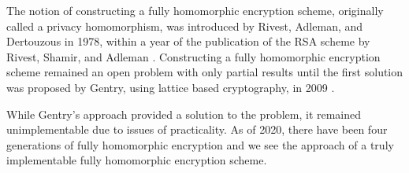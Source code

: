 The notion of constructing a fully homomorphic encryption scheme, originally called a privacy homomorphism, was introduced by Rivest, Adleman, and Dertouzous in 1978, within a year of the publication of the RSA scheme by Rivest, Shamir, and Adleman \cite{rivest1978}. Constructing a fully homomorphic encryption scheme remained an open problem with only partial results until the first solution was proposed by Gentry, using lattice based cryptography, in 2009 \cite{gentry}.

While Gentry's approach provided a solution to the problem, it remained unimplementable due to issues of practicality. As of 2020, there have been four generations of fully homomorphic encryption and we see the approach of a truly implementable fully homomorphic encryption scheme.